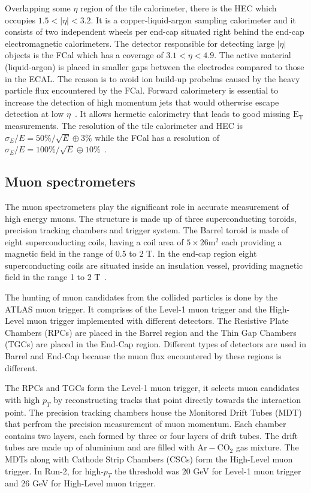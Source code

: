 Overlapping some $\eta$ region of the tile calorimeter, there is the HEC which occupies
$1.5 < |\eta| < 3.2$. It is a copper-liquid-argon sampling calorimeter and it consists of two independent wheels per end-cap situated right behind the end-cap electromagnetic
calorimeters. The detector responsible for detecting large $|\eta|$ objects is the FCal which has a coverage of $3.1 < \eta < 4.9$. The active material (liquid-argon) is 
placed in smaller gaps between the electrodes compared to those in the ECAL. The reason is to avoid ion build-up probelms caused by the heavy particle flux 
encountered by the FCal. Forward calorimetery is essential to increase the detection of high momentum jets that would otherwise escape detection at low 
$\eta$~\cite{J-P-Archambault_2008}. It allows hermetic calorimetry that leads to good missing $\text{E}_\text{T}$ measurements. The resolution of the tile 
calorimeter and HEC is $\sigma_E/E = 50\%/\sqrt{E} \oplus 3\%$ while the FCal has a resolution of $\sigma_E/E = 100\%/\sqrt{E} \oplus 10\%$~\cite{A-Artamonov_2008}.
 


\subsection{Muon spectrometers}
The muon spectrometers play the significant role in accurate measurement of high energy muons. The structure is made up of three superconducting toroids, 
precision tracking chambers and trigger system. The Barrel toroid is made of eight superconducting coils, having a coil area of $5 \times 26 \text{m}^2$ each 
providing a magnetic field in the range of 0.5 to 2 T. In the end-cap region eight superconducting coils are situated inside an insulation vessel, providing magnetic 
field in the range 1 to 2 T~\cite{Palestini:2003noa}. 

The hunting of muon candidates from the collided particles is done by the ATLAS muon trigger. It comprises of the Level-1 muon trigger and the High-Level muon trigger implemented with 
different detectors. The Resistive Plate Chambers (RPCs) are placed in the Barrel region and the Thin Gap Chambers (TGCs) are placed in the End-Cap region. Different types of 
detectors are used in Barrel and End-Cap because the muon flux encountered by these regions is different. 

The RPCs and TGCs form the Level-1 muon trigger, it selects muon
candidates with high $p_T$ by reconstructing tracks that point directly towards the interaction point. The precision tracking 
chambers house the Monitored Drift Tubes (MDT) that perfrom the precision measurement of muon momentum. Each chamber
contains two layers, each formed by three or four layers of drift tubes. The drift tubes are made up of aluminium and are filled with $\text{Ar}-\text{CO}_2$ gas mixture.
The MDTs along with Cathode Strip Chambers (CSCs) form the High-Level muon trigger. In Run-2, for high-$p_T$ the threshold was 20 GeV for Level-1 muon trigger and 26 GeV 
for High-Level muon trigger.  

